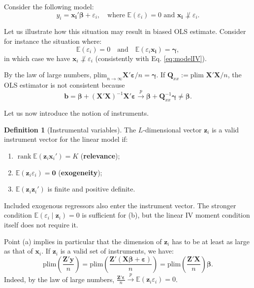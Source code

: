 \documentclass[
  11pt,
]{book}
\providecommand{\tightlist}{%
  \setlength{\itemsep}{0pt}\setlength{\parskip}{0pt}}
\theoremstyle{definition}
\newtheorem{definition}{Definition}[chapter]
\theoremstyle{definition}
\theoremstyle{definition}
\theoremstyle{definition}
\theoremstyle{remark}
\begin{document}
Consider the following model:
\begin{equation}
y_i = \mathbf{x_i}'\boldsymbol\beta + \varepsilon_i, \quad \mbox{where } \mathbb{E}(\varepsilon_i)=0  \mbox{ and } \mathbf{x_i}\not\perp \varepsilon_i.\label{eq:modelIV}
\end{equation}

Let us illustrate how this situation may result in biased OLS estimate. Consider for instance the situation where:
\begin{equation}
\mathbb{E}(\varepsilon_i)=0 \quad \mbox{and} \quad \mathbb{E}(\varepsilon_i \mathbf{x_i})=\boldsymbol\gamma,\label{eq:exmIV}
\end{equation}
in which case we have \(\mathbf{x}_i\not\perp \varepsilon_i\) (consistently with Eq. \eqref{eq:modelIV}).

By the law of large numbers, \(\mbox{plim}_{n \rightarrow \infty} \mathbf{X}'\boldsymbol\varepsilon / n = \boldsymbol\gamma\). If \(\mathbf{Q}_{xx} := \mbox{plim } \mathbf{X}'\mathbf{X}/n\), the OLS estimator is not consistent because
\[
\mathbf{b} = \boldsymbol\beta + (\mathbf{X}'\mathbf{X})^{-1}\mathbf{X}'\boldsymbol\varepsilon \overset{p}{\rightarrow} \boldsymbol\beta + \mathbf{Q}_{xx}^{-1}\boldsymbol\gamma \ne \boldsymbol\beta.
\]

Let us now introduce the notion of instruments.

\begin{definition}[Instrumental variables]
\protect\hypertarget{def:instruments}{}\label{def:instruments}The \(L\)-dimensional vector \(\mathbf{z}_i\) is a valid instrument vector for the linear model if:

\begin{enumerate}
\def\labelenumi{\alph{enumi}.}
\tightlist
\item
  \(\operatorname{rank}\mathbb E(\mathbf{z}_i\mathbf{x}_i')=K\) (\textbf{relevance});
\item
  \(\mathbb E(\mathbf{z}_i\varepsilon_i)=\mathbf{0}\) (\textbf{exogeneity});
\item
  \(\mathbb E(\mathbf{z}_i\mathbf{z}_i')\) is finite and positive definite.
\end{enumerate}

Included exogenous regressors also enter the instrument vector. The stronger condition \(\mathbb E(\varepsilon_i\mid\mathbf{z}_i)=0\) is sufficient for (b), but the linear IV moment condition itself does not require it.
\end{definition}

Point (a) implies in particular that the dimension of \(\mathbf{z}_i\) has to be at least as large as that of \(\mathbf{x}_i\). If \(\mathbf{z}_i\) is a valid set of instruments, we have:
\[
\mbox{plim}\left( \frac{\mathbf{Z}'\mathbf{y}}{n} \right) =\mbox{plim}\left( \frac{\mathbf{Z}'(\mathbf{X}\boldsymbol\beta + \boldsymbol\varepsilon)}{n} \right) = \mbox{plim}\left( \frac{\mathbf{Z}'\mathbf{X}}{n} \right)\boldsymbol\beta.
\]
Indeed, by the law of large numbers, \(\frac{\mathbf{Z}'\boldsymbol\varepsilon}{n} \overset{p}{\rightarrow}\mathbb{E}(\mathbf{z}_i\varepsilon_i)=0\).
\end{document}
